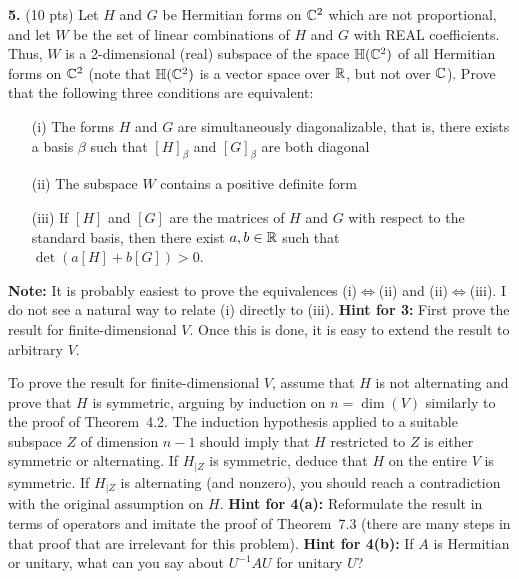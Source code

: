 \documentclass[12pt]{amsart}
\begin{document}
\skv
{\bf 5.} (10 pts) Let $H$ and $G$ be Hermitian forms on ${\mathbb C}^2$ which are not proportional, and let $W$ be the set of linear combinations of $H$ and $G$ with REAL coefficients. Thus, $W$ is a 2-dimensional (real) subspace of the space
$\mathbb H({\mathbb C}^2)$ of all Hermitian forms on ${\mathbb C}^2$ (note that $\mathbb H({\mathbb C}^2)$ is a vector space over ${\mathbb R}$, but not over ${\mathbb C}$). Prove that the following three conditions are equivalent:
\begin{itemize}
\item[(i)] The forms $H$ and $G$ are simultaneously diagonalizable, that is, there exists a basis $\beta$ such that
$[H]_{\beta}$ and $[G]_{\beta}$ are both diagonal
\item[(ii)] The subspace $W$ contains a positive definite form
\item[(iii)] If $[H]$ and $[G]$ are the matrices of $H$ and $G$ with respect to the standard basis, then there exist
$a,b\in{\mathbb R}$ such that $\det(a[H]+b[G])>0$.
\end{itemize}
{\bf Note:} It is probably easiest to prove the equivalences  (i)$\iff$(ii) and  (ii)$\iff$(iii). I do not see a natural way to relate (i) directly to (iii).
\newpage
{\bf Hint for 3:} First prove the result for finite-dimensional $V$. Once this is done, it is easy to extend the result to arbitrary $V$.

To prove the result for finite-dimensional $V$, assume that $H$ is not alternating and prove that $H$ is symmetric,
arguing by induction on $n=\dim(V)$ similarly to the proof of Theorem~4.2. The induction hypothesis applied to a suitable subspace $Z$ of dimension $n-1$ should imply that $H$ restricted 
to $Z$ is either symmetric or alternating. If $H_{| Z}$ is symmetric, deduce that $H$ on the entire $V$ is symmetric. If $H_{| Z}$ is alternating (and nonzero), you should reach a contradiction with the original assumption on $H$. 
\newpage
{\bf Hint for 4(a):} Reformulate the result in terms of operators and imitate the proof of Theorem~7.3 (there are many steps in that proof that are irrelevant for this problem).
\newpage
{\bf Hint for 4(b):} If $A$ is Hermitian or unitary, what can you say about $U^{-1}AU$ for unitary $U$?
\end{document}
